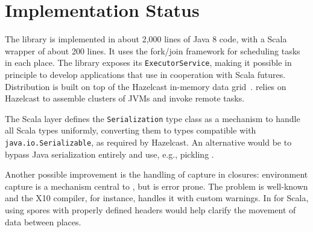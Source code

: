\section{Implementation Status}
\label{sec:serialization}

The \apgas library is implemented in about 2,000 lines of Java 8 code, with a
Scala wrapper of about 200 lines. It uses the fork/join framework for
scheduling tasks in each place. The library exposes its
\lstinline{ExecutorService}, making it possible in principle to develop applications that
use \apgas in cooperation with Scala futures.
Distribution is built on top of the Hazelcast in-memory
data grid~\cite{hazelcast}. \apgas relies on Hazelcast to
assemble clusters of JVMs and invoke remote tasks. 

The Scala layer defines the \lstinline{Serialization} type class as a mechanism
to handle all Scala types uniformly, converting them to types
compatible with \lstinline{java.io.Serializable}, as required by Hazelcast. An
alternative would be to bypass Java serialization entirely and use, e.g.,
pickling
\cite{MillerETAL13InstantPicklesGeneratingObjectorientedPicklerCombinators}.

Another possible improvement is the handling of capture in closures:
environment capture is a mechanism central to \apgas, but is error prone. The
problem is well-known and the X10 compiler, for instance, handles it with
custom warnings. In \apgas for Scala, using spores with properly defined
headers
\cite{MillerHallerOdersky14SporesTypebasedFoundationClosuresAgeConcurrency}
would help clarify the movement of data between places.



%


